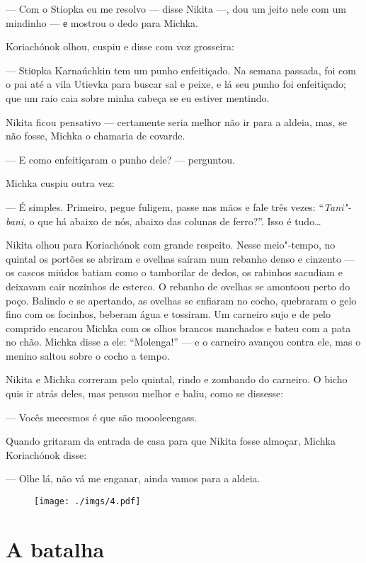 --- Com o Stiopka eu me resolvo --- disse Nikita ---, dou um jeito nele
com um mindinho --- е mostrou o dedo para Michka.

Koriachónok olhou, cuspiu e disse com voz grosseira:

--- Stiоpka Karnaúchkin tem um punho enfeitiçado. Na semana passada, foi
com o pai até a vila Utievka para buscar sal e peixe, e lá seu punho foi
enfeitiçado; que um raio caia sobre minha cabeça se eu estiver mentindo.

Nikita ficou pensativo --- certamente seria melhor não ir para a aldeia,
mas, se não fosse, Michka o chamaria de covarde.

--- E como enfeitiçaram o punho dele? --- perguntou.

Michka cuspiu outra vez:

--- É simples. Primeiro, pegue fuligem, passe nas mãos e fale três
vezes: ``\emph{Tani"-bani}, o que há abaixo de nós, abaixo das colunas de
ferro?''. Isso é tudo\ldots{}

Nikita olhou para Koriachónok com grande respeito. Nesse meio"-tempo, no
quintal os portões se abriram e ovelhas saíram num rebanho denso e
cinzento --- os cascos miúdos batiam como o tamborilar de dedos, os
rabinhos sacudiam e deixavam cair nozinhos de esterco. O rebanho de
ovelhas se amontoou perto do poço. Balindo e se apertando, as ovelhas se
enfiaram no cocho, quebraram o gelo fino com os focinhos, beberam água e
tossiram. Um carneiro sujo e de pelo comprido encarou Michka com os
olhos brancos manchados e bateu com a pata no chão. Michka disse a ele:
``Molenga!'' --- e o carneiro avançou contra ele, mas o menino saltou
sobre o cocho a tempo.

Nikita e Michka correram pelo quintal, rindo e zombando do carneiro. O
bicho quis ir atrás deles, mas pensou melhor e baliu, como se dissesse:

--- Vocês meeesmos é que são moooleengass.

Quando gritaram da entrada de casa para que Nikita fosse almoçar, Michka
Koriachónok disse:

--- Olhe lá, não vá me enganar, ainda vamos para a aldeia.

\begin{figure}
\vspace*{-2.65cm}
\hspace*{-2.85cm}\texttt{[image: ./imgs/4.pdf]}
\end{figure}

\chapter{A batalha}

